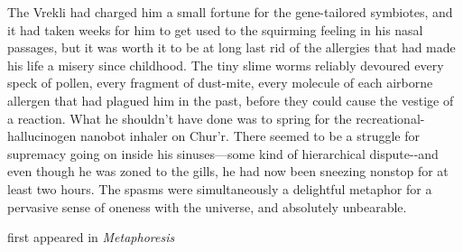 The Vrekli had charged him a small fortune for the gene-tailored
symbiotes, and it had taken weeks for him to get used to the squirming
feeling in his nasal passages, but it was worth it to be at long last
rid of the allergies that had made his life a misery since childhood.
The tiny slime worms reliably devoured every speck of pollen, every
fragment of dust-mite, every molecule of each airborne allergen that had
plagued him in the past, before they could cause the vestige of a
reaction. What he shouldn't have done was to spring for the
recreational-hallucinogen nanobot inhaler on Chur'r. There seemed to be
a struggle for supremacy going on inside his sinuses---some kind of
hierarchical dispute-\/-and even though he was zoned to the gills, he
had now been sneezing nonstop for at least two hours. The spasms were
simultaneously a delightful metaphor for a pervasive sense of oneness
with the universe, and absolutely unbearable.

first appeared in \emph{Metaphoresis}
